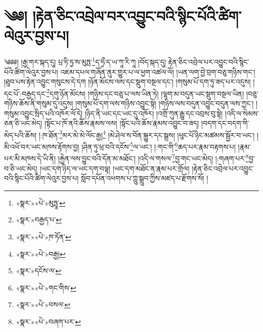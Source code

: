 \chapter{༄༅། །རྟེན་ཅིང་འབྲེལ་བར་འབྱུང་བའི་སྙིང་པོའི་ཚིག་ལེའུར་བྱས་པ།}༄༅༅། །རྒྱ་གར་སྐད་དུ། པྲ་ཏི་ཏྱ་ས་མུཏྤ་\footnote{«སྣར་»«པེ་»མུཏྤཱ་}ད་ཧྲྀ་ད་ཡ་ཀཱ་རི་ཀཱ །བོད་སྐད་དུ། རྟེན་ཅིང་འབྲེལ་པར་འབྱུང་བའི་སྙིང་པོའི་ཚིག་ལེའུར་བྱས་པ། འཇམ་དཔལ་གཞོན་ནུར་གྱུར་པ་ལ་ཕྱག་འཚལ་ལོ། །ཡན་ལག་བྱེ་བྲག་བཅུ་གཉིས་གང་། །ཐུབ་པས་རྟེན་འབྱུང་གསུངས་དེ་དག །ཉོན་མོངས་ལས་དང་སྡུག་བསྔལ་དང་། །གསུམ་པོ་དག་ཏུ་ཟད་པར་འདུས། །དང་པོ་:བརྒྱད་དང་\footnote{«སྣར་»བརྒྱད་པ་}དགུ་ཉོན་མོངས། །གཉིས་དང་བཅུ་པ་ལས་ཡིན་ཏེ། །ལྷག་མ་བདུན་ཡང་སྡུག་བསྔལ་ཡིན། །བཅུ་གཉིས་ཆོས་ནི་གསུམ་དུ་འདུས། །གསུམ་པོ་དག་ལས་གཉིས་འབྱུང་སྟེ། །གཉིས་ལས་བདུན་འབྱུང་བདུན་ལས་ཀྱང་། །གསུམ་འབྱུང་སྲིད་པའི་འཁོར་ལོ་དེ། །ཉིད་ནི་ཡང་དང་ཡང་དུ་འཁོར། །འགྲོ་ཀུན་རྒྱུ་དང་འབྲས་བུ་སྟེ། །འདི་ལ་སེམས་ཅན་ཅི་ཡང་མེད། །སྟོང་པ་ཁོ་ནའི་ཆོས་རྣམས་ལས། །སྟོང་པའི་ཆོས་རྣམས་འབྱུང་བ་ཟད། །བདག་དང་བདག་གི་མེད་པའི་ཆོས། །:ཁ་ཐོན་\footnote{«སྣར་»«པེ་»ཁ་ཏོན་}མར་མེ་མེ་ལོང་རྒྱ།\footnote{«སྣར་»«པེ་»བརྒྱ།} །མེ་ཤེལ་ས་བོན་སྐྱུར་དང་སྒྲས། །ཕུང་པོ་ཉིང་མཚམས་སྦྱོར་བ་ཡང་། །མི་འཕོ་བར་ཡང་མཁས་རྟོགས་བྱ། །ཤིན་ཏུ་ཕྲ་བའི་དངོས་\footnote{«སྣར་»དངོས་ལ་}ལ་ཡང་། །:གང་གི་\footnote{«སྣར་»«པེ་»གང་གིས་}ཆད་པར་རྣམ་བརྟགས་པ། །རྣམ་པར་མི་མཁས་དེ་ཡི་ནི། །རྐྱེན་ལས་བྱུང་བའི་དོན་མ་མཐོང་། །འདི་ལ་གསལ་\footnote{«སྣར་»«པེ་»བསལ་}བྱ་གང་ཡང་མེད། །:གཞག་པར་\footnote{«སྣར་»«པེ་»བཞག་པར་}བྱ་བ་ཅི་ཡང་མེད། །ཡང་དག་ཉིད་ལ་ཡང་དག་བལྟ། །ཡང་དག་མཐོང་ན་རྣམ་པར་གྲོལ། །རྟེན་ཅིང་འབྲེལ་པར་འབྱུང་བའི་སྙིང་པོའི་ཚིག་ལེའུར་བྱས་པ། སློབ་དཔོན་འཕགས་པ་ཀླུ་སྒྲུབ་ཀྱིས་མཛད་པ་རྫོགས་སོ། ། 